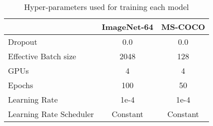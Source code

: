 \begin{table}
\caption{Hyper-parameters used for training each model}
\vskip 0.05in
\centering
\begin{tabular}{lcc}
\toprule
 & ImageNet-64 & MS-COCO \\
\midrule
Dropout & 0.0 & 0.0 \\
Effective Batch size & 2048 & 128 \\
GPUs & 4 & 4   \\
Epochs & 100 & 50 \\
Learning Rate & 1e-4 & 1e-4 \\
Learning Rate Scheduler & Constant & Constant \\
\bottomrule
\end{tabular}
\label{tab:hyper-params}
\end{table}
